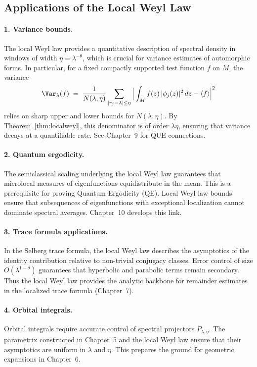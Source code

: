 \subsection{Applications of the Local Weyl Law}

\paragraph{1. Variance bounds.}
The local Weyl law provides a quantitative description of spectral density in windows of width $\eta=\lambda^{-\theta}$, which is crucial for variance estimates of automorphic forms.  
In particular, for a fixed compactly supported test function $f$ on $M$, the variance
\[
\Var_\lambda(f) \;=\; \frac{1}{N(\lambda,\eta)} \sum_{|r_j-\lambda|\leq \eta} \Big|\int_M f(z)\,|\phi_j(z)|^2\,dz - \langle f \rangle \Big|^2
\]
relies on sharp upper and lower bounds for $N(\lambda,\eta)$.  
By Theorem~\ref{thm:localweyl}, this denominator is of order $\lambda \eta$, ensuring that variance decays at a quantifiable rate.  
See Chapter~9 for QUE connections.

\paragraph{2. Quantum ergodicity.}
The semiclassical scaling underlying the local Weyl law guarantees that microlocal measures of eigenfunctions equidistribute in the mean.  
This is a prerequisite for proving Quantum Ergodicity (QE).  
Local Weyl law bounds ensure that subsequences of eigenfunctions with exceptional localization cannot dominate spectral averages.  
Chapter~10 develops this link.

\paragraph{3. Trace formula applications.}
In the Selberg trace formula, the local Weyl law describes the asymptotics of the identity contribution relative to non-trivial conjugacy classes.  
Error control of size $O(\lambda^{1-\delta})$ guarantees that hyperbolic and parabolic terms remain secondary.  
Thus the local Weyl law provides the analytic backbone for remainder estimates in the localized trace formula (Chapter~7).

\paragraph{4. Orbital integrals.}
Orbital integrals require accurate control of spectral projectors $P_{\lambda,\eta}$.  
The parametrix constructed in Chapter~5 and the local Weyl law ensure that their asymptotics are uniform in $\lambda$ and $\eta$.  
This prepares the ground for geometric expansions in Chapter~6.

